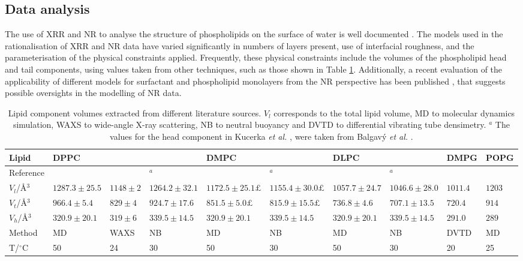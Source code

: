 \documentclass[amsmath,amssymb,twocolumn,superscriptaddress]{revtex4-1}
\begin{document}
\subsection{Data analysis}
%
The use of XRR and NR to analyse the structure of phospholipids on the surface of water is well documented \cite{mohwald_phospholipid_1990,kewalramani_effects_2010,bayerl_specular_1990,johnson_structure_1991,clifton_role_2012,helm_phospholipid_1987,daillant_x-ray_1990}.
The models used in the rationalisation of XRR and NR data have varied significantly in numbers of layers present, use of interfacial roughness, and the parameterisation of the physical constraints applied.
Frequently, these physical constraints include the volumes of the phospholipid head and tail components, using values taken from other techniques, such as those shown in Table \ref{tab:water}.
Additionally, a recent evaluation of the applicability of different models for surfactant and phospholipid monolayers from the NR perspective has been published \cite{campbell_structure_2018}, that suggests possible oversights in the modelling of NR data.
%
\begin{table}
    \caption{\label{tab:water} Lipid component volumes extracted from different literature sources.
  $V_l$ corresponds to the total lipid volume, MD to molecular dynamics simulation, WAXS to wide-angle X-ray scattering, NB to neutral buoyancy and DVTD to differential vibrating tube densimetry. $^a$
  The values for the head component in Kucerka \emph{et al.} \cite{kucerka_determination_2004}, were taken from Balgav\'{y} \emph{et al.} \cite{balgavy_evaluation_2001}.}
  \begin{ruledtabular}
    \begin{tabular*}{\textwidth}{l|lll|ll|ll|l|l}
    Lipid & DPPC & & & DMPC & & DLPC & & DMPG & POPG \\
    \hline
    Reference & \cite{armen_phospholipid_1998} & \cite{sun_order_1994} &
    \cite{kucerka_determination_2004,balgavy_evaluation_2001}$^a$ & \cite{armen_phospholipid_1998} & \cite{kucerka_determination_2004,balgavy_evaluation_2001}$^a$ & \cite{armen_phospholipid_1998} & \cite{kucerka_determination_2004,balgavy_evaluation_2001}$^a$ & \cite{pan_molecular_2012} &
    \cite{kucerka_scattering_2012} \\
    \hline
    $V_l$/\AA$^3$ & $1287.3\pm25.5$ & $1148\pm2$ & $1264.2\pm32.1$ &
    $1172.5\pm25.1£$ & $1155.4\pm30.0£$ & $1057.7\pm24.7$ & $1046.6\pm28.0$ &
    $1011.4$ & $1203$ \\
    $V_t$/\AA$^3$ & $966.4\pm5.4$ & $829\pm4$ & $924.7\pm17.6$ &
    $851.5\pm5.0£$ & $815.9\pm15.5£$ & $736.8\pm4.6$ & $707.1\pm13.5$ &
    $720.4$ & $914$ \\
    $V_h$/\AA$^3$ & $320.9\pm20.1$ & $319\pm6$ & $339.5\pm14.5$ &
    $320.9\pm20.1$ & $339.5\pm14.5$ & $320.9\pm20.1$ & $339.5\pm14.5$ &
    $291.0$ & $289$ \\
    Method & MD & WAXS & NB & MD & NB & MD & NB & DVTD & MD \\
    T/$^\circ$C & 50 & 24 & 30 & 50 & 30 & 50 & 30 & 20 & 25 \\
    \end{tabular*}
  \end{ruledtabular}
\end{table}
%
\end{document}
